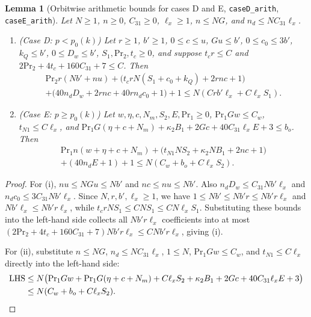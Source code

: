\documentclass[11pt]{amsart}
\theoremstyle{plain}
\newtheorem{lemma}[theorem]{Lemma}
\theoremstyle{definition}
\numberwithin{equation}{section}
\begin{document}
\begin{lemma}[Orbitwise arithmetic bounds for cases D and E, \texttt{caseD\_arith}, \texttt{caseE\_arith}]\label{lem:caseDE}
Let $N\ge1$, $n\ge0$, $C_{31}\ge0$, $\ell_x\ge1$, $n\le NG$, and $n_d\le N C_{31}\ell_x$.
\begin{enumerate}[label=(\roman*)]
\item \textup{(Case D: $p<p_0(k)$)} Let $r\ge1$, $b'\ge1$, $0\le c\le u$, $Gu\le b'$,
  $0\le c_0\le 3b'$, $k_Q\le b'$, $0\le D_w\le b'$, $S_1,\mathrm{Pr}_2,t_c\ge0$, and suppose
  $t_c r\le C$ and $2\mathrm{Pr}_2+4t_c+160 C_{31}+7\le C$. Then
  \begin{multline*}
  \mathrm{Pr}_2 r(Nb'+nu)+\bigl(t_c r N(S_1+c_0+k_Q)+2rnc+1\bigr)\\
  +\bigl(40 n_d D_w+2rnc+40 r n_d c_0+1\bigr)+1 \le N(Crb'\ell_x+C\ell_x S_1).
  \end{multline*}
\item \textup{(Case E: $p\ge p_0(k)$)} Let $w,\eta,c,N_m,S_2,E,\mathrm{Pr}_1\ge0$,
  $\mathrm{Pr}_1 G w\le C_w$, $t_{N1}\le C\ell_x$, and
  $\mathrm{Pr}_1 G(\eta+c+N_m)+\kappa_2 B_1+2Gc+40 C_{31}\ell_x E+3\le b_o$. Then
  \begin{multline*}
  \mathrm{Pr}_1 n(w+\eta+c+N_m)+\bigl(t_{N1} N S_2+\kappa_2 N B_1+2nc+1\bigr)\\
  +(40 n_d E+1)+1 \le N(C_w+b_o+C\ell_x S_2).
  \end{multline*}
\end{enumerate}
\end{lemma}

\begin{proof}
For (i), $nu\le NGu\le Nb'$ and $nc\le nu\le Nb'$. Also $n_d D_w\le C_{31}Nb'\ell_x$ and
$n_d c_0\le 3C_{31}Nb'\ell_x$. Since $N,r,b',\ell_x\ge1$, we have $1\le Nb'\le Nb'r\le Nb'r\ell_x$
and $Nb'\ell_x\le Nb'r\ell_x$, while $t_c r N S_1\le C N S_1\le C N\ell_x S_1$. Substituting these
bounds into the left-hand side collects all $Nb'r\ell_x$ coefficients into at most
$(2\mathrm{Pr}_2+4t_c+160 C_{31}+7)Nb'r\ell_x\le C Nb'r\ell_x$, giving (i).

For (ii), substitute $n\le NG$, $n_d\le N C_{31}\ell_x$, $1\le N$, $\mathrm{Pr}_1 Gw\le C_w$, and
$t_{N1}\le C\ell_x$ directly into the left-hand side:
\begin{align*}
\text{LHS} &\le N\bigl(\mathrm{Pr}_1 Gw+\mathrm{Pr}_1 G(\eta+c+N_m)+C\ell_x S_2+\kappa_2 B_1+2Gc+40 C_{31}\ell_x E+3\bigr)\\
&\le N(C_w+b_o+C\ell_x S_2). \qedhere
\end{align*}
\end{proof}
\end{document}
